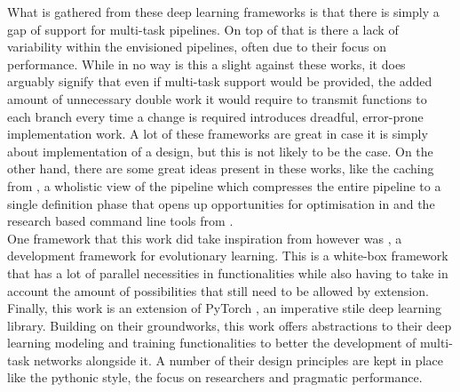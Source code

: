 What is gathered from these deep learning frameworks is that there is simply a gap of support for multi-task pipelines. On top of that is there a lack of variability within the envisioned pipelines, often due to their focus on performance. While in no way is this a slight against these works, it does arguably signify that even if multi-task support would be provided, the added amount of unnecessary double work it would require to transmit functions to each branch every time a change is required introduces dreadful, error-prone implementation work. A lot of these frameworks are great in case it is simply about implementation of a design, but this is not likely to be the case. On the other hand, there are some great ideas present in these works, like the caching from \cite{dong2017tensorlayer}, a wholistic view of the pipeline which compresses the entire pipeline to a single definition phase that opens up opportunities for optimisation in \cite{tokui2019chainer} and the research based command line tools from \cite{chen2019selene}.\\ 


One framework that this work did take inspiration from however was \cite{de2012deap}, a development framework for evolutionary learning. This is a white-box framework that has a lot of parallel necessities in functionalities while also having to take in account the amount of possibilities that still need to be allowed by extension.\\

Finally, this work is an extension of PyTorch \citep{paszke2019pytorch}, an imperative stile deep learning library. Building on their groundworks, this work offers abstractions to their deep learning modeling and training functionalities to better the development of multi-task networks alongside it. A number of their design principles are kept in place like the pythonic style, the focus on researchers and pragmatic performance.\\


